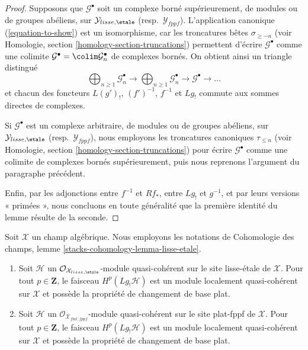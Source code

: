 \begin{proof}
\medskip\noindent
Supposons que $\mathcal{G}^\bullet$ soit un complexe borné supérieurement, de
modules ou de groupes abéliens, sur $\mathcal{Y}_{lisse,\etale}$ (resp.\
$\mathcal{Y}_{fppf}$). L'application canonique
(\ref{equation-to-show}) est un isomorphisme, car les troncatures bêtes
$\sigma_{\geq -n}$ (voir Homologie, section
\ref{homology-section-truncations}) permettent d'écrire
$\mathcal{G}^\bullet$ comme une colimite
$\mathcal{G}^\bullet = \colim \mathcal{G}_n^\bullet$
de complexes bornés. On obtient ainsi un triangle distingué
$$
\bigoplus\nolimits_{n \geq 1} \mathcal{G}_n^\bullet \to
\bigoplus\nolimits_{n \geq 1} \mathcal{G}_n^\bullet \to
\mathcal{G}^\bullet \to \ldots
$$
et chacun des foncteurs $L(g')_!$, $(f')^{-1}$, $f^{-1}$ et $Lg_!$ commute aux
sommes directes de complexes.

\medskip\noindent
Si $\mathcal{G}^\bullet$ est un complexe arbitraire, de modules ou de groupes
abéliens, sur $\mathcal{Y}_{lisse,\etale}$ (resp.\
$\mathcal{Y}_{fppf}$), nous employons les troncatures canoniques
$\tau_{\leq n}$ (voir Homologie, section
\ref{homology-section-truncations}) pour écrire $\mathcal{G}^\bullet$ comme une
colimite de complexes bornés supérieurement, puis nous reprenons l'argument du
paragraphe précédent.

\medskip\noindent
Enfin, par les adjonctions entre $f^{-1}$ et $Rf_*$, entre $Lg_!$ et $g^{-1}$,
et par leurs versions « primées », nous concluons en toute généralité que la
première identité du lemme résulte de la seconde.
\end{proof}

\begin{lemma}
\label{lemma-higher-shriek-quasi-coherent}
Soit $\mathcal{X}$ un champ algébrique. Nous employons les notations de
Cohomologie des champs, lemme
\ref{stacks-cohomology-lemma-lisse-etale}.
\begin{enumerate}
\item Soit $\mathcal{H}$ un
$\mathcal{O}_{\mathcal{X}_{lisse,\etale}}$-module quasi-cohérent sur le site
lisse-\'etale de $\mathcal{X}$. Pour tout $p \in \mathbf{Z}$, le faisceau
$H^p(Lg_!\mathcal{H})$ est un module localement quasi-cohérent sur
$\mathcal{X}$ et possède la propriété de changement de base plat.
\item Soit $\mathcal{H}$ un
$\mathcal{O}_{\mathcal{X}_{flat,fppf}}$-module quasi-cohérent sur le site
plat-fppf de $\mathcal{X}$. Pour tout $p \in \mathbf{Z}$, le faisceau
$H^p(Lg_!\mathcal{H})$ est un module localement quasi-cohérent sur
$\mathcal{X}$ et possède la propriété de changement de base plat.
\end{enumerate}
\end{lemma}

